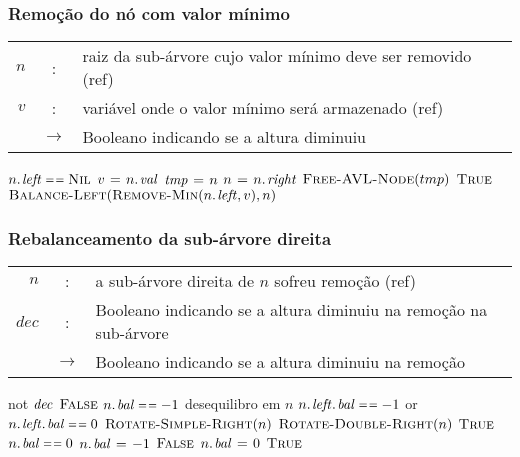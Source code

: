 \documentclass{beamer}
\begin{document}
\begin{frame}
\frametitle{Remoção do nó com valor mínimo}

\begin{tabular}{rcl}
$n$ & : & raiz da sub-árvore cujo valor mínimo deve ser removido (ref) \\
$v$ & : & variável onde o valor mínimo será armazenado (ref) \\
& $\rightarrow$ & Booleano indicando se a altura diminuiu
\end{tabular}

\begin{codebox}
\li \If $\attrib{n}{left} \isequal \const{Nil}$
\li \Then
      $v \gets \attrib{n}{val}$
\li   $\id{tmp} \gets n$
\li   $n \gets \attrib{n}{right}$
\li   $\textnormal{\scshape Free-AVL-Node}(tmp)$
\li   \Return $\textnormal{\scshape True}$
\li \Else
\li   \Return $\proc{Balance-Left}(\proc{Remove-Min}(\attrib{n}{left}, v), n)$
    \End  
\end{codebox}

\end{frame}

\begin{frame}
\frametitle{Rebalanceamento da sub-árvore direita}

\begin{small}
\begin{tabular}{rcl}
$n$ & : & a sub-árvore direita de $n$ sofreu remoção (ref) \\
$dec$ & : & Booleano indicando se a altura diminuiu na remoção na sub-árvore \\
& $\rightarrow$ & Booleano indicando se a altura diminuiu na remoção
\end{tabular}

\begin{codebox}
\li \If not $\id{dec}$
\li \Then \Return $\textnormal{\scshape False}$
    \End
\li \If $\attrib{n}{bal} \isequal -1$ \> \> \> \> \> \Comment desequilibro em $n$
\li \Then
      \If $\attrib{\attrib{n}{left}}{bal} \isequal -1$ or
          $\attrib{\attrib{n}{left}}{bal} \isequal 0$
\li   \Then
        $\textnormal{\scshape Rotate-Simple-Right}(n)$
\li   \ElseNoIf 
        $\textnormal{\scshape Rotate-Double-Right}(n)$
      \End
\li   \Return $\textnormal{\scshape True}$
\li \ElseIf $\attrib{n}{bal} \isequal 0$
\li \Then
      $\attrib{n}{bal} \gets -1$
\li   \Return $\textnormal{\scshape False}$
\li \ElseNoIf
      $\attrib{n}{bal} \gets 0$
\li   \Return $\textnormal{\scshape True}$
    \End
\end{codebox}
\end{small}

\end{frame}
\end{document}
